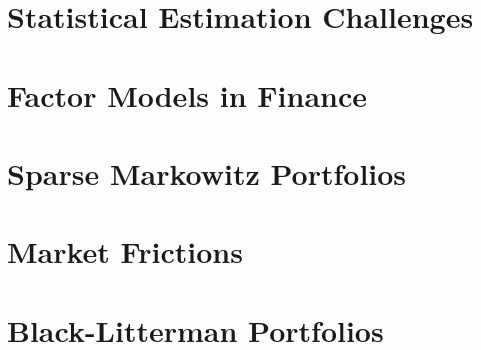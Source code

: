 \section{Statistical Estimation Challenges}

\section{Factor Models in Finance}

\section{Sparse Markowitz Portfolios}

\section{Market Frictions}

\section{Black-Litterman Portfolios}
\fi

